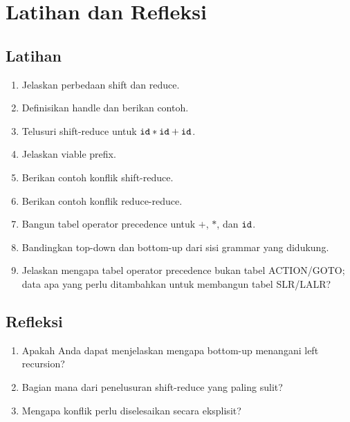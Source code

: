 \section*{Latihan dan Refleksi}

\subsection*{Latihan}
\begin{enumerate}[label=\arabic*.,leftmargin=*]
  \item Jelaskan perbedaan shift dan reduce.
  \item Definisikan handle dan berikan contoh.
  \item Telusuri shift-reduce untuk \(\texttt{id} * \texttt{id} +
        \texttt{id}\).
  \item Jelaskan viable prefix.
  \item Berikan contoh konflik shift-reduce.
  \item Berikan contoh konflik reduce-reduce.
  \item Bangun tabel operator precedence untuk \(+\), \(*\), dan
        \(\texttt{id}\).
  \item Bandingkan top-down dan bottom-up dari sisi grammar yang
        didukung.
  \item Jelaskan mengapa tabel operator precedence bukan tabel
        ACTION/GOTO; data apa yang perlu ditambahkan untuk membangun
        tabel SLR/LALR?
\end{enumerate}

\subsection*{Refleksi}
\begin{reflectionbox}
\begin{enumerate}[label=\arabic*.,leftmargin=*]
  \item Apakah Anda dapat menjelaskan mengapa bottom-up menangani
        left recursion?
  \item Bagian mana dari penelusuran shift-reduce yang paling sulit?
  \item Mengapa konflik perlu diselesaikan secara eksplisit?
\end{enumerate}
\end{reflectionbox}
